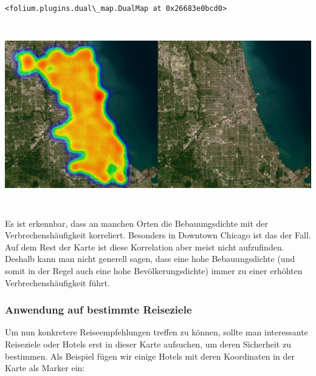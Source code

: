 \documentclass[10pt]{article}
\makeatletter
\newcommand{\boxspacing}{\kern\kvtcb@left@rule\kern\kvtcb@boxsep}
\newcommand{\prompt}[4]{
        {\ttfamily\llap{{\color{#2}[#3]:\hspace{3pt}#4}}\vspace{-\baselineskip}}
    }
\makeatother
\begin{document}
            \begin{tcolorbox}[breakable, size=fbox, boxrule=.5pt, pad at break*=1mm, opacityfill=0]
\prompt{Out}{outcolor}{12}{\boxspacing}
\begin{Verbatim}[commandchars=\\\{\}]
<folium.plugins.dual\_map.DualMap at 0x26683e0bcd0>
\end{Verbatim}
\end{tcolorbox}

\begin{center}
  \includegraphics[height=8cm]{vergleich}
\end{center}
        
    Es ist erkennbar, dass an manchen Orten die Bebauungsdichte mit der
Verbrechenshäufigkeit korreliert. Besonders in Downtown Chicago ist das
der Fall. Auf dem Rest der Karte ist diese Korrelation aber meist nicht
aufzufinden. Deshalb kann man nicht generell sagen, dass eine hohe
Bebauungsdichte (und somit in der Regel auch eine hohe
Bevölkerungsdichte) immer zu einer erhöhten Verbrechenshäufigkeit führt.

    \subsubsection{Anwendung auf bestimmte
Reiseziele}\label{anwendung-auf-bestimmte-reiseziele}

Um nun konkretere Reiseempfehlungen treffen zu können, sollte man
interessante Reiseziele oder Hotels erst in dieser Karte aufsuchen, um
deren Sicherheit zu bestimmen. Als Beispiel fügen wir einige Hotels mit
deren Koordinaten in der Karte als Marker ein:
\end{document}
